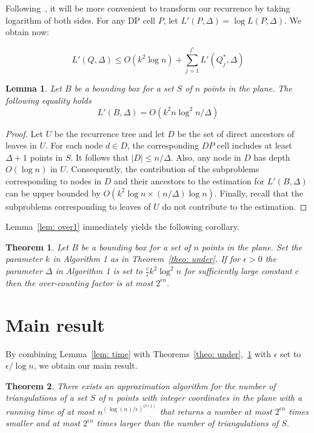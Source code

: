 \documentclass[a4paper]{article}
\newtheorem{theorem}{Theorem}
\newtheorem{lemma}{Lemma}
\begin{document}
Following~\cite{ABRS13}, it will be more convenient
to transform our recurrence by taking
logarithm of both sides.
For any DP cell $P$, let
$L'(P,\Delta)=\log L(P,\Delta)$.
We obtain now:

$$L'(Q,\Delta)\le
O(k^2\log n ) +\sum_{j=1}^{l^*}L'(Q_j^*,\Delta)$$

\begin{lemma}\label{lem: over2}
Let $B$ be a bounding box for a set $S$ of
$n$ points in the plane.
The following equality holds
$$L'(B,\Delta)=O(k^2n\log^2 n/\Delta )$$
\end{lemma}
\begin{proof}
Let $U$ be the recurrence tree and let $D$
be the set of direct ancestors of leaves
in $U$. For each node $d\in D$, the corresponding
$DP$ cell includes at least $\Delta +1$ 
points in $S$. It follows that $|D|\le n/\Delta $.
Also, any node in $D$ has depth $O(\log n)$  in $U$.
Consequently, the contribution of the subproblems
corresponding to  nodes in $D$
and their ancestors to the estimation for $L'(B,\Delta)$
can be upper bounded by $O(k^2\log n \times (n/\Delta)\log n)$.
Finally, recall that the subproblems corresponding
to leaves of $U$ do not contribute 
to the estimation.
\end{proof}

Lemma~\ref{lem: over1} 
immediately yields
the following corollary.

\begin{theorem}\label{theo: over}
Let $B$ be a bounding box for a set of
$n$ points in the plane.
Set the parameter $k$ in Algorithm 1
as in Theorem~\ref{theo: under}.
If for $\epsilon >0$
the parameter $\Delta$ in Algorithm 1
is set to $\frac c{\epsilon}k^2\log^2 n$
for sufficiently large constant $c$ then
the over-counting factor is at most
$2^{\epsilon n}$.
\end{theorem}

\section{Main result}

By combining Lemma~\ref{lem: time}
with Theorems~\ref{theo: under},~\ref{theo: over} with $\epsilon$
set to $\epsilon /\log n$, we obtain
our main result.


\begin{theorem}\label{theo: main}
There exists an approximation
algorithm for 
the number of triangulations of a set $S$
of $n$ points with integer coordinates in the plane
with a running time of at most
$n^{(\log (n) /\epsilon)^{O(1)}}$  that returns
a number at most $2^{\epsilon n}$ times
smaller and at most $2^{\epsilon n}$ times
larger than the number of triangulations
of $S$.
\end{theorem}
\end{document}
